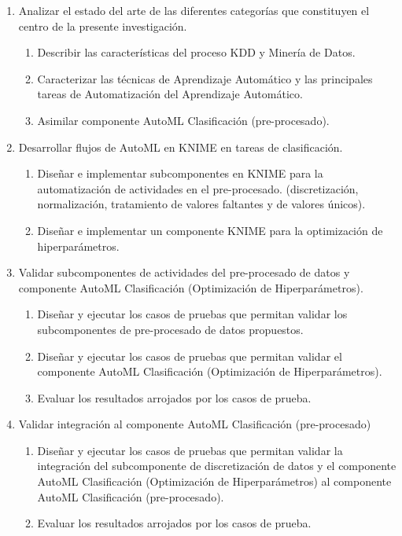 \begin{enumerate}
	\item Analizar el estado del arte de las diferentes categorías que constituyen el centro de la presente investigación.
	\begin{enumerate}
		\item Describir las características del proceso KDD y Minería de Datos. 
		\item Caracterizar las técnicas de Aprendizaje Automático y las principales tareas de Automatización del Aprendizaje Automático.
		\item Asimilar componente AutoML Clasificación (pre-procesado).
	\end{enumerate}
	\item Desarrollar flujos de AutoML en KNIME en tareas de clasificación.
	\begin{enumerate}
		\item Diseñar e implementar subcomponentes en KNIME para la automatización de actividades en el pre-procesado. (discretización, normalización, tratamiento de valores faltantes y de valores únicos).
		\item Diseñar e implementar un componente KNIME para la optimización de hiperparámetros.
	\end{enumerate}
	\item Validar subcomponentes de actividades del pre-procesado de datos y componente AutoML Clasificación (Optimización de Hiperparámetros).
	\begin{enumerate}
		\item Diseñar y ejecutar los casos de pruebas que permitan validar los subcomponentes de pre-procesado de datos propuestos. 
		\item Diseñar y ejecutar los casos de pruebas que permitan validar el componente AutoML Clasificación (Optimización de Hiperparámetros).
		\item Evaluar los resultados arrojados por los casos de prueba.
	\end{enumerate} 
	\item Validar integración al componente AutoML Clasificación (pre-procesado)
	\begin{enumerate}
		\item Diseñar y ejecutar los casos de pruebas que permitan validar la integración del subcomponente de discretización de datos y el componente AutoML Clasificación (Optimización de Hiperparámetros) al componente AutoML Clasificación (pre-procesado).
		\item Evaluar los resultados arrojados por los casos de prueba.
	\end{enumerate}
\end{enumerate}

